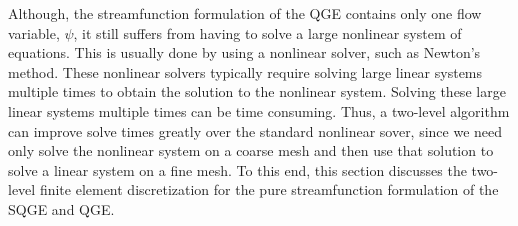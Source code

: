Although, the streamfunction formulation of the QGE contains only one flow
variable, $\psi$, it still suffers from
having to solve a large nonlinear system of equations. This is usually done by
using a nonlinear solver, such as Newton's method. These nonlinear solvers
typically require solving large linear systems multiple times to obtain the
solution to the nonlinear system. Solving these large linear systems multiple
times can be time consuming. Thus, a two-level algorithm can improve solve times
greatly over the standard nonlinear sover, since we need only solve the
nonlinear system on a coarse mesh and then use that solution to solve a linear
system on a fine mesh. To this end, this section discusses the two-level
finite element discretization for the pure streamfunction formulation of the
SQGE and QGE.
